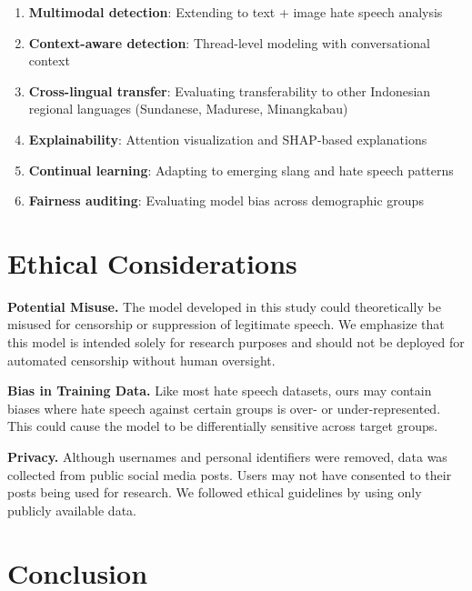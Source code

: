 \documentclass[10pt,twocolumn]{article}
\begin{document}
\begin{enumerate}[leftmargin=*,nosep]
    \item \textbf{Multimodal detection}: Extending to text + image hate speech analysis
    \item \textbf{Context-aware detection}: Thread-level modeling with conversational context
    \item \textbf{Cross-lingual transfer}: Evaluating transferability to other Indonesian regional languages (Sundanese, Madurese, Minangkabau)
    \item \textbf{Explainability}: Attention visualization and SHAP-based explanations
    \item \textbf{Continual learning}: Adapting to emerging slang and hate speech patterns
    \item \textbf{Fairness auditing}: Evaluating model bias across demographic groups
\end{enumerate}

\section{Ethical Considerations}

\textbf{Potential Misuse.} The model developed in this study could theoretically be misused for censorship or suppression of legitimate speech. We emphasize that this model is intended solely for research purposes and should not be deployed for automated censorship without human oversight.

\textbf{Bias in Training Data.} Like most hate speech datasets, ours may contain biases where hate speech against certain groups is over- or under-represented. This could cause the model to be differentially sensitive across target groups.

\textbf{Privacy.} Although usernames and personal identifiers were removed, data was collected from public social media posts. Users may not have consented to their posts being used for research. We followed ethical guidelines by using only publicly available data.

\section{Conclusion}
\end{document}
